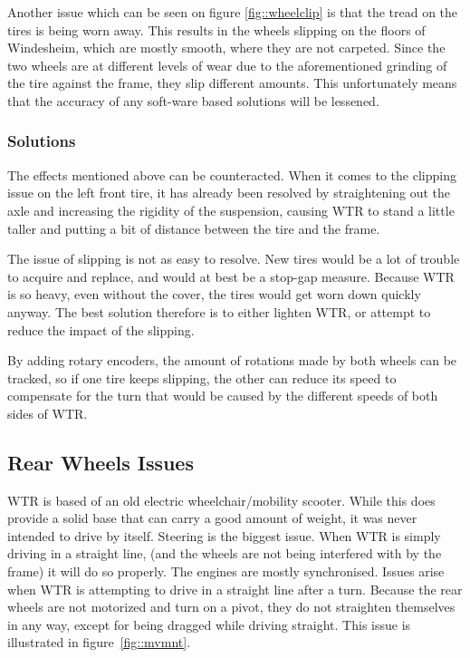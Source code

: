 Another issue which can be seen on figure \ref{fig::wheelclip} is that the tread on the tires is being worn away.
This results in the wheels slipping on the floors of Windesheim, which are mostly smooth, where they are not carpeted.
Since the two wheels are at different levels of wear due to the aforementioned grinding of the tire against the frame, they slip different amounts.
This unfortunately means that the accuracy of any soft-ware based solutions will be lessened.

\subsubsection{Solutions}
The effects mentioned above can be counteracted.
When it comes to the clipping issue on the left front tire, it has already been resolved by straightening out the axle and increasing the rigidity of the suspension, causing WTR to stand a little taller and putting a bit of distance between the tire and the frame.

The issue of slipping is not as easy to resolve.
New tires would be a lot of trouble to acquire and replace, and would at best be a stop-gap measure.
Because WTR is so heavy, even without the cover, the tires would get worn down quickly anyway.
The best solution therefore is to either lighten WTR, or attempt to reduce the impact of the slipping.

By adding rotary encoders, the amount of rotations made by both wheels can be tracked, so if one tire keeps slipping, the other can reduce its speed to compensate for the turn that would be caused by the different speeds of both sides of WTR.


\subsection{Rear Wheels Issues}
WTR is based of an old electric wheelchair/mobility scooter.
While this does provide a solid base that can carry a good amount of weight, it was never intended to drive by itself.
Steering is the biggest issue.
When WTR is simply driving in a straight line, (and the wheels are not being interfered with by the frame) it will do so properly.
The engines are mostly synchronised.
Issues arise when WTR is attempting to drive in a straight line after a turn.
Because the rear wheels are not motorized and turn on a pivot, they do not straighten themselves in any way, except for being dragged while driving straight.
This issue is illustrated in figure~\ref{fig::mvmnt}.

